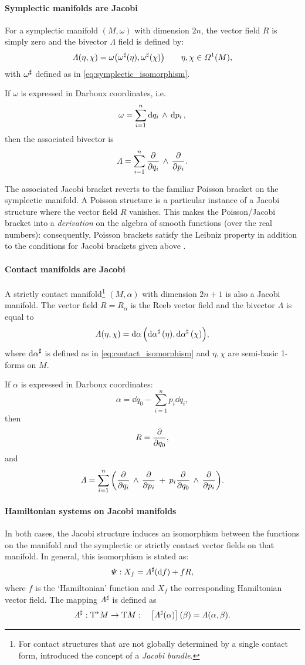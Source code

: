 \paragraph{Symplectic manifolds are Jacobi}
For a symplectic manifold $(M, \omega)$ with dimension $2n$, the vector field $R$ is simply zero and the bivector $\Lambda$ field is defined by:
$$ \Lambda(\eta, \chi) = \omega\qty(\omega^\sharp(\eta), \omega^\sharp(\chi)) \qquad \eta, \chi \in \Omega^{1}(M), $$
with $\omega^\sharp$ defined as in \cref{eq:symplectic_isomorphism}. 

If $\omega$ is expressed in Darboux coordinates, i.e.
$$ \omega = \sum^n_{i = 1}  \dd{q_i}\,\wedge\,\dd{p_i} ,$$
then the associated bivector is \cite{chinea1998}
$$ \Lambda = \sum^n_{i = 1}  \pdv{}{q_i}\,\wedge\,\pdv{}{p_i} .$$

The associated Jacobi bracket reverts to the familiar Poisson bracket on the symplectic manifold. A Poisson structure is a particular instance of a Jacobi structure where the vector field $R$ vanishes. This makes the Poisson/Jacobi bracket into a \emph{derivation} on the algebra of smooth functions (over the real numbers): consequently, Poisson brackets satisfy the Leibniz property in addition to the conditions for Jacobi brackets given above \cite{marle1991}.

\paragraph{Contact manifolds are Jacobi}
A strictly contact manifold\footnote{For contact structures that are not globally determined by a single contact form, \citet{marle1991} introduced the concept of a \emph{Jacobi bundle}.} $(M, \alpha)$ with dimension $2n + 1$ is also a Jacobi manifold. The vector field $R = R_\alpha$ is the Reeb vector field and the bivector $\Lambda$ is equal to
$$ \Lambda(\eta, \chi) = \dd{\alpha}\qty(\dd{\alpha}^\sharp(\eta), \dd{\alpha}^\sharp(\chi)), $$
where $\dd{\alpha}^\sharp$ is defined as in \cref{eq:contact_isomorphism} and $\eta,\chi$ are semi-basic 1-forms on $M$.

If $\alpha$ is expressed in Darboux coordinates:
$$ \alpha = \dd{q}_0 - \sum^n_{i = 1} p_i\dd{q_i}, $$
then
$$ R = \pdv{}{q_0},$$
and
$$ \Lambda = \sum_{i = 1}^n \qty(  \pdv{}{q_i}\,\wedge\,\pdv{}{p_i} \:+\: p_i  \pdv{}{q_0}\,\wedge\,\pdv{}{p_i} ). $$

\paragraph{Hamiltonian systems on Jacobi manifolds} In both cases, the Jacobi structure induces an isomorphism between the functions on the manifold and the symplectic or strictly contact vector fields on that manifold. In general, this isomorphism is stated as:
$$ \Psi: X_f = \Lambda^\sharp(\dd{f}) + f R, $$
where $f$ is the `Hamiltonian' function and $X_f$ the corresponding Hamiltonian vector field. The mapping $\Lambda^\sharp$ is defined as
$$ \Lambda^\sharp: \mathrm{T}^*M \to \mathrm{T}M: \quad \qty[\Lambda^\sharp(\alpha)](\beta) = \Lambda(\alpha, \beta). $$

